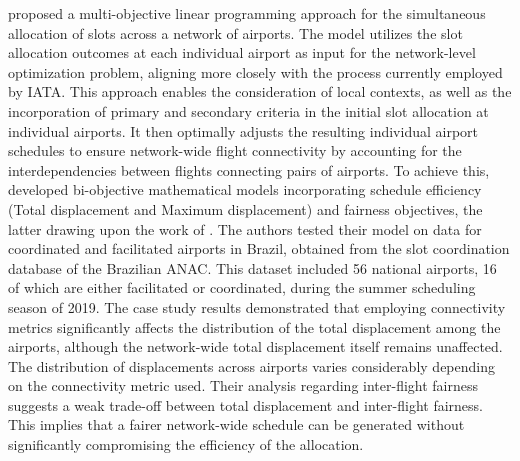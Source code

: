  proposed a multi-objective linear programming
approach for the simultaneous allocation of slots across a network of airports.
%
The model utilizes the slot allocation outcomes at each individual airport as
input for the network-level optimization problem, aligning more closely with the
process currently employed by \acrshort{IATA}.
%
This approach enables the consideration of local contexts, as well as the
incorporation of primary and secondary criteria in the initial slot allocation
at individual airports.
%
It then optimally adjusts the resulting individual airport schedules to ensure
network-wide flight connectivity by accounting for the interdependencies between
flights connecting pairs of airports.
%
To achieve this,  developed bi-objective
mathematical models incorporating schedule efficiency (Total displacement and
Maximum displacement) and fairness objectives, the latter drawing upon the work
of .
%
The authors tested their model on data for coordinated and facilitated airports
in Brazil, obtained from the slot coordination database of the Brazilian
\acrshort{ANAC}.
%
This dataset included 56 national airports, 16 of which are either facilitated
or coordinated, during the summer scheduling season of 2019.
%
The case study results demonstrated that employing connectivity metrics
significantly affects the distribution of the total displacement among the
airports, although the network-wide total displacement itself remains
unaffected.
%
The distribution of displacements across airports varies considerably depending
on the connectivity metric used.
%
Their analysis regarding inter-flight fairness suggests a weak trade-off between
total displacement and inter-flight fairness.
%
This implies that a fairer network-wide schedule can be generated without
significantly compromising the efficiency of the allocation.




